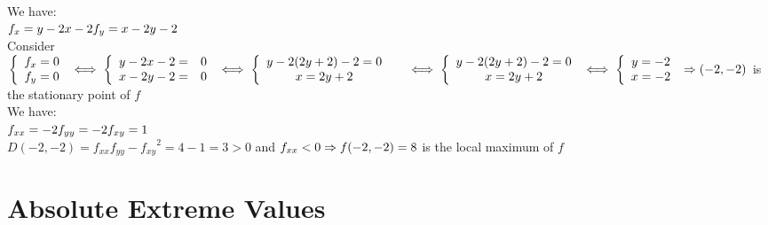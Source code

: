 \documentclass{article}
\begin{document}
We have:\\
$f_x=y-2x-2\\
f_y=x-2y-2$\\
Consider
$\left\{
\begin{array}{cr}
     f_x=0\\
     f_y=0
\end{array}
\right.
\iff
\left\{
\begin{array}{cr}
     y-2x-2=&0  \\
     x-2y-2=&0 
\end{array}
\right.
\iff
\left\{
\begin{array}{cr}
    y-2(2y+2)-2=0&  \\
    x=2y+2
\end{array}
\right.\\
\iff
\left\{
\begin{array}{cr}
    y-2(2y+2)-2=0  \\
    x=2y+2
\end{array}
\right.
\iff
\left\{
\begin{array}{cr}
    y=-2  \\
    x=-2
\end{array}
\right.\\
\Rightarrow (-2,-2)$ is the stationary point of $f$\\
We have:\\
  $f_{xx}=-2\\
    f_{yy}=-2\\
    f_{xy}=1$\\
$D(-2,-2)=f_{xx}f_{yy}-{f_{xy}}^2=4-1=3>0$ and $f_{xx}<0\\
\Rightarrow f(-2,-2)=8$ is the local maximum of $f$
\section{Absolute Extreme Values}
\end{document}
